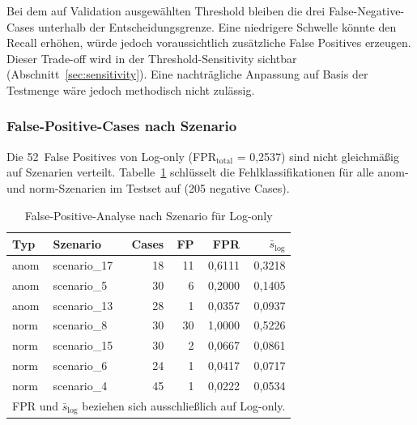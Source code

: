 Bei dem auf Validation ausgewählten Threshold bleiben die drei False-Negative-Cases unterhalb der Entscheidungsgrenze. Eine niedrigere Schwelle könnte den Recall erhöhen, würde jedoch voraussichtlich zusätzliche False Positives erzeugen. Dieser Trade-off wird in der Threshold-Sensitivity sichtbar (Abschnitt~\ref{sec:sensitivity}). Eine nachträgliche Anpassung auf Basis der Testmenge wäre jedoch methodisch nicht zulässig.

\subsubsection{False-Positive-Cases nach Szenario}

Die 52~False Positives von Log-only (FPR$_{\text{total}}$ = 0{,}2537) sind nicht gleichmäßig auf Szenarien verteilt. Tabelle~\ref{tab:fp_scenario} schlüsselt die Fehlklassifikationen für alle anom- und norm-Szenarien im Testset auf (205 negative Cases).

\begingroup
\setlength{\intextsep}{6pt}%
\setlength{\abovecaptionskip}{4pt}%
\setlength{\belowcaptionskip}{2pt}%
\renewcommand{\arraystretch}{0.90}
\setlength{\tabcolsep}{3pt}
\begin{table}[htb]
  \centering
  \scriptsize
  \caption{False-Positive-Analyse nach Szenario für Log-only}
  \label{tab:fp_scenario}
  \begin{tabular}{llrrrr}
    \hline
    \textbf{Typ} & \textbf{Szenario} & \textbf{Cases} & \textbf{FP} & \textbf{FPR} & \textbf{$\bar{s}_{\text{log}}$} \\
    \hline
    anom & scenario\_17 & 18 & 11 & 0{,}6111 & 0{,}3218 \\
    anom & scenario\_5  & 30 &  6 & 0{,}2000 & 0{,}1405 \\
    anom & scenario\_13 & 28 &  1 & 0{,}0357 & 0{,}0937 \\
    norm & scenario\_8  & 30 & 30 & 1{,}0000 & 0{,}5226 \\
    norm & scenario\_15 & 30 &  2 & 0{,}0667 & 0{,}0861 \\
    norm & scenario\_6  & 24 &  1 & 0{,}0417 & 0{,}0717 \\
    norm & scenario\_4  & 45 &  1 & 0{,}0222 & 0{,}0534 \\
    \hline
    \multicolumn{6}{l}{\scriptsize FPR und $\bar{s}_{\text{log}}$ beziehen sich ausschließlich auf Log-only.} \\
  \end{tabular}
\end{table}
\endgroup

